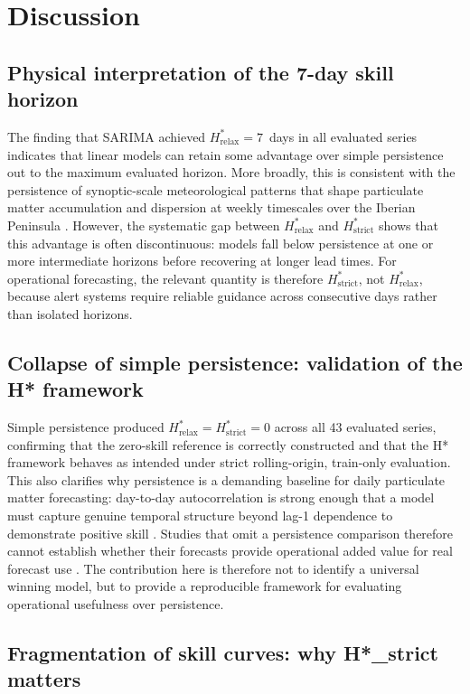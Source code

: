 \documentclass[12pt, a4paper]{article}
\newcommand{\Hrelax}{H^{*}_{\mathrm{relax}}}
\newcommand{\Hstrict}{H^{*}_{\mathrm{strict}}}
\begin{document}
\section{Discussion}
\subsection{Physical interpretation of the 7-day skill horizon}
\label{sec:disc_physical}

The finding that SARIMA achieved $\Hrelax = 7$~days in all evaluated
series indicates that linear models can retain some advantage over
simple persistence out to the maximum evaluated horizon. More broadly,
this is consistent with the persistence of synoptic-scale
meteorological patterns that shape particulate matter accumulation and
dispersion at weekly timescales over the Iberian Peninsula
\citep{Pey2013, Pay2014}. However, the systematic gap between
$\Hrelax$ and $\Hstrict$ shows that this advantage is often
discontinuous: models fall below persistence at one or more
intermediate horizons before recovering at longer lead times. For
operational forecasting, the relevant quantity is therefore
$\Hstrict$, not $\Hrelax$, because alert systems require reliable
guidance across consecutive days rather than isolated horizons.

\subsection{Collapse of simple persistence: validation of the
            H* framework}
\label{sec:disc_baseline}

Simple persistence produced $\Hrelax = \Hstrict = 0$ across all
43 evaluated series, confirming that the zero-skill reference is
correctly constructed and that the H* framework behaves as intended
under strict rolling-origin, train-only evaluation. This also
clarifies why persistence is a demanding baseline for daily
particulate matter forecasting: day-to-day autocorrelation is strong
enough that a model must capture genuine temporal structure beyond
lag-1 dependence to demonstrate positive skill \citep{Tashman2000}.
Studies that omit a persistence comparison therefore cannot establish
whether their forecasts provide operational added value for real
forecast use
\citep{GarciaCrespi2026}. The contribution here is therefore not to
identify a universal winning model, but to provide a reproducible
framework for evaluating operational usefulness over persistence.

\subsection{Fragmentation of skill curves: why H*\_strict matters}
\label{sec:disc_fragmentation}
\end{document}
